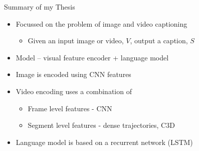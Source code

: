 \documentclass{beamer}
\begin{document}
\begin{frame}{Summary of my Thesis}
\begin{itemize}
\item Focussed on the problem of image and video captioning 
    \begin{itemize}
         \item Given an input image or video, $V$, output a caption, $S$
    \end{itemize}
\item Model -- visual feature encoder + language model 
\item Image is encoded using CNN features
\item Video encoding uses a combination of
    \begin{itemize}
        \item Frame level features - CNN
        \item Segment level features - dense trajectories, C3D 
    \end{itemize}
\item Language model is based on a recurrent network (LSTM) 
\end{itemize}
\end{frame}
\end{document}

